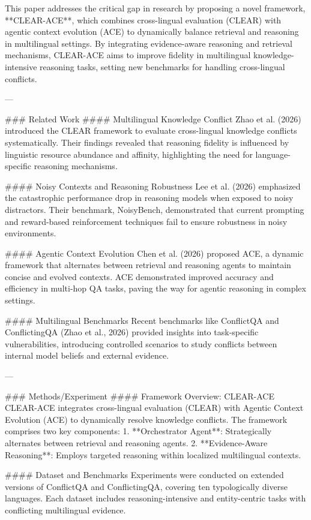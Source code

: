 This paper addresses the critical gap in research by proposing a novel framework, **CLEAR-ACE**, which combines cross-lingual evaluation (CLEAR) with agentic context evolution (ACE) to dynamically balance retrieval and reasoning in multilingual settings. By integrating evidence-aware reasoning and retrieval mechanisms, CLEAR-ACE aims to improve fidelity in multilingual knowledge-intensive reasoning tasks, setting new benchmarks for handling cross-lingual conflicts.

---

### Related Work
#### Multilingual Knowledge Conflict
Zhao et al. (2026) introduced the CLEAR framework to evaluate cross-lingual knowledge conflicts systematically. Their findings revealed that reasoning fidelity is influenced by linguistic resource abundance and affinity, highlighting the need for language-specific reasoning mechanisms.

#### Noisy Contexts and Reasoning Robustness
Lee et al. (2026) emphasized the catastrophic performance drop in reasoning models when exposed to noisy distractors. Their benchmark, NoisyBench, demonstrated that current prompting and reward-based reinforcement techniques fail to ensure robustness in noisy environments.

#### Agentic Context Evolution
Chen et al. (2026) proposed ACE, a dynamic framework that alternates between retrieval and reasoning agents to maintain concise and evolved contexts. ACE demonstrated improved accuracy and efficiency in multi-hop QA tasks, paving the way for agentic reasoning in complex settings.

#### Multilingual Benchmarks
Recent benchmarks like ConflictQA and ConflictingQA (Zhao et al., 2026) provided insights into task-specific vulnerabilities, introducing controlled scenarios to study conflicts between internal model beliefs and external evidence.

---

### Methods/Experiment
#### Framework Overview: CLEAR-ACE
CLEAR-ACE integrates cross-lingual evaluation (CLEAR) with Agentic Context Evolution (ACE) to dynamically resolve knowledge conflicts. The framework comprises two key components:
1. **Orchestrator Agent**: Strategically alternates between retrieval and reasoning agents.
2. **Evidence-Aware Reasoning**: Employs targeted reasoning within localized multilingual contexts.

#### Dataset and Benchmarks
Experiments were conducted on extended versions of ConflictQA and ConflictingQA, covering ten typologically diverse languages. Each dataset includes reasoning-intensive and entity-centric tasks with conflicting multilingual evidence.

